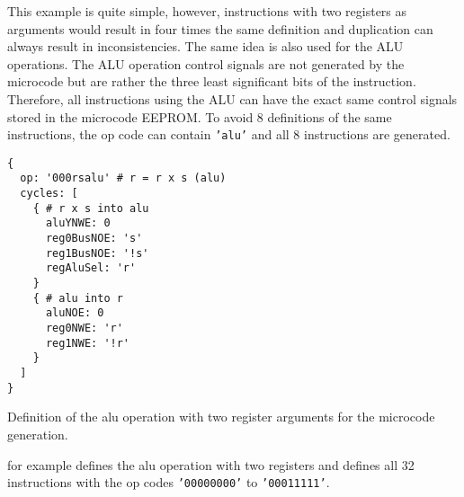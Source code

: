 This example is quite simple, however, instructions with two registers as arguments would result in four times the same definition and duplication can always result in inconsistencies.
The same idea is also used for the \gls{ALU} operations.
The \gls{ALU} operation control signals are not generated by the microcode but are rather the three least significant bits of the instruction.
Therefore, all instructions using the \gls{ALU} can have the exact same control signals stored in the microcode \gls{EEPROM}.
To avoid 8 definitions of the same instructions, the op code can contain \texttt{'alu'} and all 8 instructions are generated.
\begin{listing}[h!]
  \begin{verbatim}
{
  op: '000rsalu' # r = r x s (alu)
  cycles: [
    { # r x s into alu
      aluYNWE: 0
      reg0BusNOE: 's'
      reg1BusNOE: '!s'
      regAluSel: 'r'
    }
    { # alu into r
      aluNOE: 0
      reg0NWE: 'r'
      reg1NWE: '!r'
    }
  ]
}
  \end{verbatim}
  \caption{Definition of the alu operation with two register arguments for the microcode generation.}
  \label{lst:mc_aluRS}
\end{listing}
 for example defines the alu operation with two registers and defines all 32 instructions with the op codes \texttt{'00000000'} to \texttt{'00011111'}.

